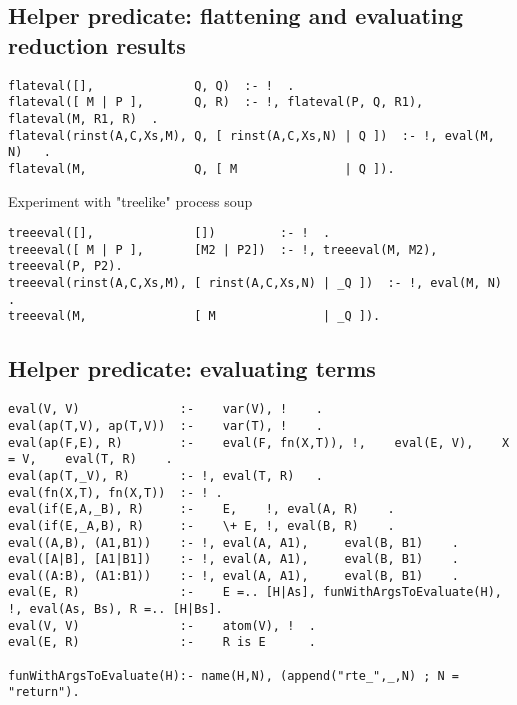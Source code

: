 \subsection{Helper predicate: flattening and evaluating reduction results}

\begin{verbatim}
flateval([],              Q, Q)  :- !  .
flateval([ M | P ],       Q, R)  :- !, flateval(P, Q, R1),  flateval(M, R1, R)  .
flateval(rinst(A,C,Xs,M), Q, [ rinst(A,C,Xs,N) | Q ])  :- !, eval(M, N)   .
flateval(M,               Q, [ M               | Q ]).
\end{verbatim}

Experiment with "treelike" process soup
\begin{verbatim}
treeeval([],              [])         :- !  .
treeeval([ M | P ],       [M2 | P2])  :- !, treeeval(M, M2), treeeval(P, P2).
treeeval(rinst(A,C,Xs,M), [ rinst(A,C,Xs,N) | _Q ])  :- !, eval(M, N)   .
treeeval(M,               [ M               | _Q ]).
\end{verbatim}

\subsection{Helper predicate: evaluating terms}

\begin{verbatim}
eval(V, V)              :-    var(V), !    .
eval(ap(T,V), ap(T,V))  :-    var(T), !    .
eval(ap(F,E), R)        :-    eval(F, fn(X,T)), !,    eval(E, V),    X = V,    eval(T, R)    .
eval(ap(T,_V), R)       :- !, eval(T, R)   .
eval(fn(X,T), fn(X,T))  :- ! .
eval(if(E,A,_B), R)     :-    E,    !, eval(A, R)    .
eval(if(E,_A,B), R)     :-    \+ E, !, eval(B, R)    .
eval((A,B), (A1,B1))    :- !, eval(A, A1),     eval(B, B1)    .
eval([A|B], [A1|B1])    :- !, eval(A, A1),     eval(B, B1)    .
eval((A:B), (A1:B1))    :- !, eval(A, A1),     eval(B, B1)    .
eval(E, R)              :-    E =.. [H|As], funWithArgsToEvaluate(H), !, eval(As, Bs), R =.. [H|Bs].
eval(V, V)              :-    atom(V), !  .
eval(E, R)              :-    R is E      .

funWithArgsToEvaluate(H):- name(H,N), (append("rte_",_,N) ; N = "return").
\end{verbatim}
